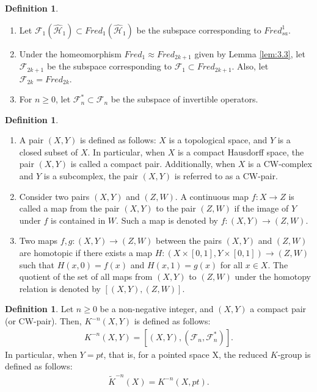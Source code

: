 \documentclass{amsart}
\theoremstyle{definition}
\newtheorem{dfn}[thm]{Definition}
\theoremstyle{remark}
\begin{document}
\begin{dfn}\label{dfn:Space of Fredholm operators}
\begin{enumerate}
\item Let $\mathcal{F}_1(\mathcal{\hat{H}}_1) \subset Fred_{1}(\mathcal{\hat{H}}_1)$ be the subspace corresponding to $Fred_{sa}^1$.
\item Under the homeomorphism $Fred_1 \approx Fred_{2k+1}$ given by Lemma \ref{lem:3.3}, let $\mathcal{F}_{2k+1}$ be the subspace corresponding to 
$\mathcal{F}_1 \subset Fred_{2k+1}$. Also, let $\mathcal{F}_{2k}=Fred_{2k}$.
\item For $n \geq 0$, let $\mathcal{F}_{n}^{*} \subset \mathcal{F}_n$ be the subspace of invertible operators.
\end{enumerate}
\end{dfn}

\begin{dfn}
\begin{enumerate}
\item A pair $(X, Y)$ is defined as follows: $X$ is a topological space, and $Y$ is a closed subset of $X$. In particular, when $X$ is a compact Hausdorff space, the pair $(X, Y)$ is called a compact pair. Additionally, when $X$ is a CW-complex and $Y$ is a subcomplex, the pair $(X, Y)$ is referred to as a CW-pair.
\item Consider two pairs $(X,Y)$ and $(Z,W)$. A continuous map $f\colon X\to Z$ is called a map from the pair $(X,Y)$ to the pair $(Z,W)$ if the image of $Y$ under $f$ is contained in $W$. Such a map is denoted by $f\colon (X,Y)\to (Z,W)$.
\item Two maps $f, g\colon (X,Y) \to (Z,W)$ between the pairs $(X,Y)$ and $(Z,W)$ are homotopic if there exists a map $H\colon (X\times[0,1], Y\times[0,1]) \to (Z,W)$ such that $H(x,0) = f(x)$ and $H(x,1) = g(x)$ for all $x \in X$. The quotient of the set of all maps from $(X,Y)$ to $(Z,W)$ under the homotopy relation is denoted by $[(X,Y), (Z,W)]$.
\end{enumerate}
\end{dfn}

\begin{dfn}
Let $n\geq 0$ be a non-negative integer, and $(X,Y)$ a compact pair (or CW-pair). Then, $K^{-n}(X,Y)$ is defined as follows:
\begin{align*}
K^{-n}(X, Y)=[(X,Y), (\mathcal{F}_n, \mathcal{F}_n^{*})].
\end{align*}
In particular, when $Y = pt$, that is, for a pointed space X, the reduced $K$-group is defined as follows:
\begin{align*}
\tilde{K}^{-n}(X)=K^{-n}(X, pt).
\end{align*}
\end{dfn}
\end{document}
